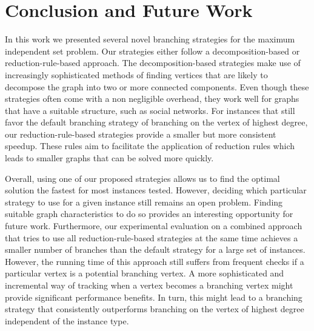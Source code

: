 \documentclass[a4paper,UKenglish,cleveref, autoref, thm-restate]{lipics-v2021}
\begin{document}
\section{Conclusion and Future Work}
In this work we presented several novel branching strategies for the maximum independent set problem.
Our strategies either follow a decomposition-based or reduction-rule-based approach.
The decomposition-based strategies make use of increasingly sophisticated methods of finding vertices that are likely to decompose the graph into two or more connected components.
Even though these strategies often come with a non negligible overhead, they work well for graphs that have a suitable structure, such as social networks.
For instances that still favor the default branching strategy of branching on the vertex of highest degree, our reduction-rule-based strategies provide a smaller but more consistent speedup.
These rules aim to facilitate the application of reduction rules which leads to smaller graphs that can be solved more quickly.

Overall, using one of our proposed strategies allows us to find the optimal solution the fastest for most instances tested.
However, deciding which particular strategy to use for a given instance still remains an open problem.
Finding suitable graph characteristics to do so provides an interesting opportunity for future work.
Furthermore, our experimental evaluation on a combined approach that tries to use all reduction-rule-based strategies at the same time achieves a smaller number of branches than the default strategy for a large set of instances.
However, the running time of this approach still suffers from frequent checks if a particular vertex is a potential branching vertex.
A more sophisticated and incremental way of tracking when a vertex becomes a branching vertex might provide significant performance benefits.
In turn, this might lead to a branching strategy that consistently outperforms branching on the vertex of highest degree independent of the instance type.

\FloatBarrier
\newpage




\newpage

\appendix
\end{document}
